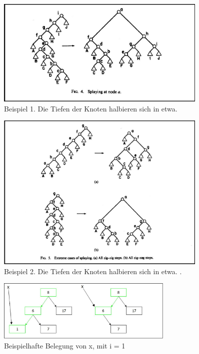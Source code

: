 \documentclass[11pt, a4paper]{article}
\begin{document}
	\begin{figure}[h]
		\centering
		\includegraphics[width=0.9\textwidth]{"bilder/halberPfad1"}
		\caption{Beispiel 1. Die Tiefen der Knoten halbieren sich in etwa. \cite{sl2}}
		\label{fig:halberPfad1}
	\end{figure}
	\begin{figure}[h]
	\centering
	\includegraphics[width=0.9\textwidth]{"bilder/halberPfad2"}
	\caption{Beispiel 2. Die Tiefen der Knoten halbieren sich in etwa. \cite{sl2}.}
	\label{fig:halberPfad2}
\end{figure}
	\begin{figure}[h]
		\centering
		\includegraphics[width=0.75\textwidth]{"bilder/splayKnotenSuche"}
		\caption{Beispielhafte Belegung von x, mit i = 1}
		\label{fig:splayKnotenSuche}
	\end{figure}
\end{document}
